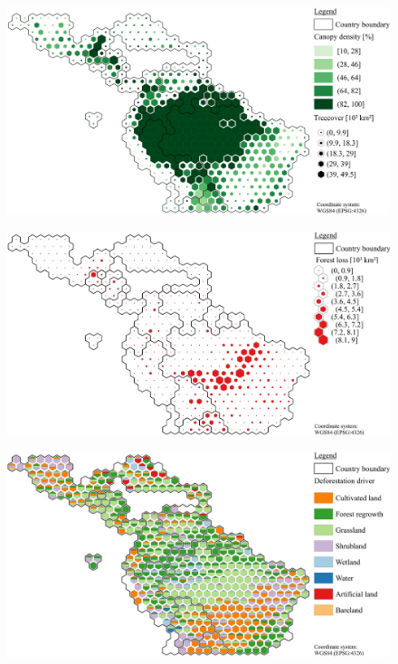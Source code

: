         \begin{figure}[ht]
		    \centering
		    \includegraphics[scale=1]{img/americas_treecover_frameless}
		    \caption[Ecosystem service values]{}
		    \label{fig:americascover}
	    \end{figure}
	    \begin{figure}[ht]
		    \centering
		    \includegraphics[scale=1]{img/americas_loss_frameless}
		    \caption[Ecosystem service values]{}
		    \label{fig:americasloss}
	    \end{figure}
	    \begin{figure}[ht]
		    \centering
		    \includegraphics[scale=1]{img/americas_driver_frameless}
		    \caption[Ecosystem service values]{}
		    \label{fig:americasdriver}
	    \end{figure}
